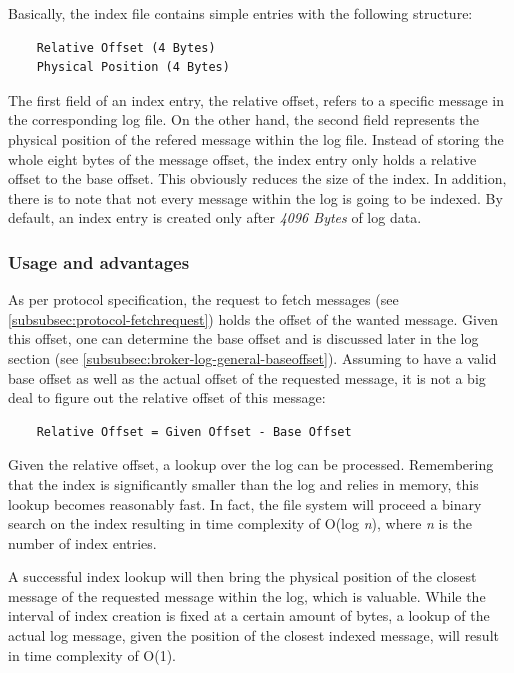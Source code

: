 Basically, the index file contains simple entries with the following
structure: 
\begin{verbatim}
    Relative Offset (4 Bytes)
    Physical Position (4 Bytes)
\end{verbatim}

The first field of an index entry, the relative offset, refers to a specific
message in the corresponding log file. On the other hand, the second field
represents the physical position of the refered message within the log file.
Instead of storing the whole eight bytes of the message offset, the index entry
only holds a relative offset to the base offset. This obviously reduces the
size of the index. In addition, there is to note that not every message within
the log is going to be indexed. By default, an index entry is created only after
\textit{4096 Bytes} of log data.

\subsubsection{Usage and advantages}

As per protocol specification, the request to fetch messages (see
\ref{subsubsec:protocol-fetchrequest}) holds the offset of the wanted message.
Given this offset, one can determine the base offset and is discussed later
in the log section (see \ref{subsubsec:broker-log-general-baseoffset}).
Assuming to have a valid base offset as well as the actual offset of the
requested message, it is not a big deal to figure out the relative offset of
this message:

\begin{verbatim}
    Relative Offset = Given Offset - Base Offset
\end{verbatim}

Given the relative offset, a lookup over the log can be processed. Remembering
that the index is significantly smaller than the log and relies in memory, this
lookup becomes reasonably fast. In fact, the file system will proceed a binary
search on the index resulting in time complexity of O(log \textit{n}), where
\textit{n} is the number of index entries.

A successful index lookup will then bring the physical position of
the closest message of the requested message within the log, which is valuable. While
the interval of index creation is fixed at a certain amount of bytes, a lookup
of the actual log message, given the position of the closest indexed message,
will result in time complexity of O(1).

